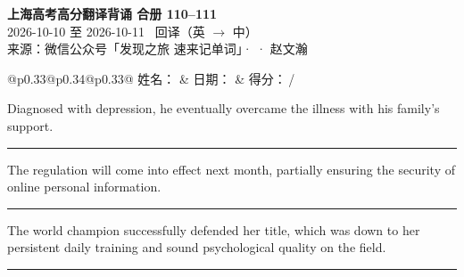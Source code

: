 \documentclass[11pt,a4paper]{article}
\newcommand{\num}[1]{\makebox[1.9em][r]{#1.}\hspace{0.3em}}
\newcommand{\wline}{\noindent\rule{\linewidth}{0.4pt}}
\begin{document}
\pagestyle{plain}
\begin{center}
{\LARGE\bfseries 上海高考高分翻译背诵 \quad 合册 110–111}\\[0.25em]
{\large 2026-10-10 至 2026-10-11 \quad\ 回译（英 $\to$ 中）}\\[0.35em]
{\footnotesize 来源：微信公众号「发现之旅 速来记单词」·  · 赵文瀚}
\end{center}

\vspace{0.4em}
\noindent\begin{tabular}{@{}p{0.33\textwidth}@{}p{0.34\textwidth}@{}p{0.33\textwidth}@{}}
姓名：\underline{\hspace{2.0cm}} & 日期：\underline{\hspace{2.0cm}} & 得分：\underline{\hspace{1.4cm}}\,/ \\
\end{tabular}

\vspace{0.5em}

\vspace{0.8em}
\vspace{0.35em}\vspace{0.15em}

\begin{minipage}{\linewidth}

\num{1}Diagnosed with depression, he eventually overcame the illness with his family’s support.

\vspace{0.25em}

\wline

\end{minipage}

\begin{minipage}{\linewidth}

\num{2}The regulation will come into effect next month, partially ensuring the security of online personal information.

\vspace{0.25em}

\wline

\end{minipage}

\begin{minipage}{\linewidth}

\num{3}The world champion successfully defended her title, which was down to her persistent daily training and sound psychological quality on the field.

\vspace{0.25em}

\wline

\end{minipage}
\end{document}
